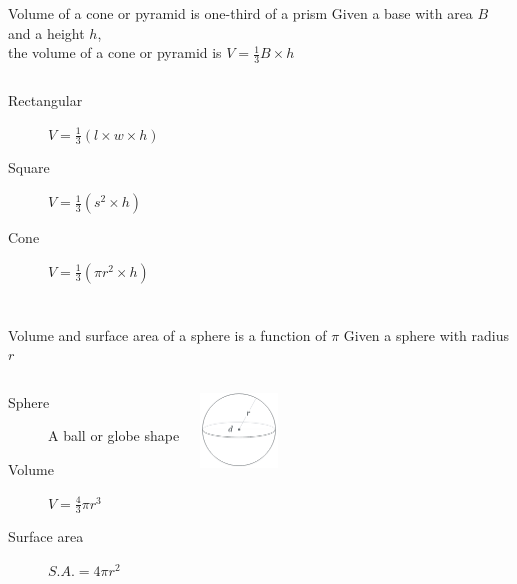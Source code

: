 \begin{frame}{Volume of a cone or pyramid is one-third of a prism} 
  Given a base with area $B$ and a height $h$, \\
  the volume of a cone or pyramid is $V= \frac{1}{3} B \times h$
  \vspace{0.5cm}
  \begin{columns}
    \begin{description}
      \item[Rectangular] $V= \frac{1}{3} (l \times w \times h)$
      \item[Square] $V= \frac{1}{3} (s^2 \times h)$
      \item[Cone] $V= \frac{1}{3} (\pi r^2 \times h)$ 
    \end{description}
  \end{columns} \vspace{0.5cm}
  \end{frame}

\begin{frame}{Volume and surface area of a sphere is a function of $\pi$} 
  Given a sphere with radius $r$
  \vspace{0.5cm}
  \begin{columns}
    \begin{description}
      \item[Sphere] A ball or globe shape
      \item[Volume] $V= \frac{4}{3} \pi r^3$
      \item[Surface area] $S.A.= 4 \pi r^2$ 
    \end{description}
    \includegraphics[width=0.5\textwidth]{../graphics/sphere.png}
  \end{columns} \vspace{0.5cm}
  \end{frame}
  
